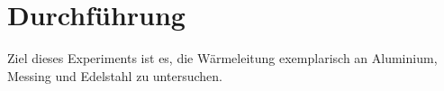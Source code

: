 \section{Durchführung}
\label{sec:Durchführung}
Ziel dieses Experiments ist es, die Wärmeleitung exemplarisch an Aluminium, Messing und Edelstahl zu untersuchen. 
